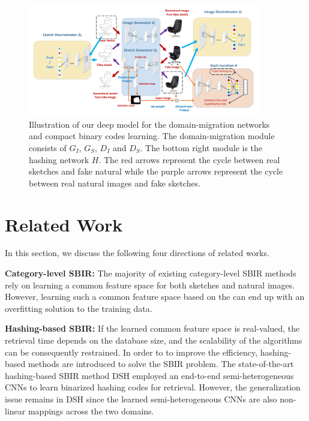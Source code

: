 \documentclass[runningheads]{llncs}
\begin{document}
\begin{figure}
\vspace{-5ex}
    \centering
    \includegraphics[width = 0.9\textwidth]{figures/overview2.pdf}
    \vspace{-3ex}
    \caption{Illustration of our deep model for the domain-migration networks and compact binary codes learning. The domain-migration module  consists of $G_I$, $G_S$, $D_I$ and $D_S$. The bottom right module is the hashing network $H$. The red arrows represent the cycle between real sketches and fake natural while the purple arrows represent the cycle between real natural images and fake sketches.}
    \label{fig:overview}
    \vspace{-5ex}
\end{figure}

\section{Related Work}
In this section, we discuss the following four directions of related works. 

\noindent\textbf{Category-level SBIR:} The majority of existing category-level SBIR methods \cite{SaavedraB10,EitzHBA10,LiuSSLS17,SaavedraB15,hu2010,ParuiM14,dalal2005,hu2010_1,Saavedra14,Lowe99,LiHSG14} rely on learning a common feature space for both sketches and natural images. However, learning such a common feature space based on the  can end up with an overfitting solution to the training data.

\noindent\textbf{Hashing-based SBIR:} If the learned common feature space is real-valued, the retrieval time depends on the database size, and the scalability of the algorithms can be consequently restrained. In order to to improve the efficiency, hashing-based methods \cite{DH15cvpr,liu2014discrete,KSH2012,shen2015supervised,SH08,zhang2016efficient,shen2017tmm,qin2017action,liu2017coding} are introduced to solve the SBIR problem. The state-of-the-art hashing-based SBIR method DSH \cite{liu2017coding} employed an end-to-end semi-heterogeneous CNNs to learn binarized hashing codes for retrieval. However, the generalization issue remains in DSH since the learned semi-heterogeneous CNNs are also non-linear mappings across the two domains.
\end{document}
